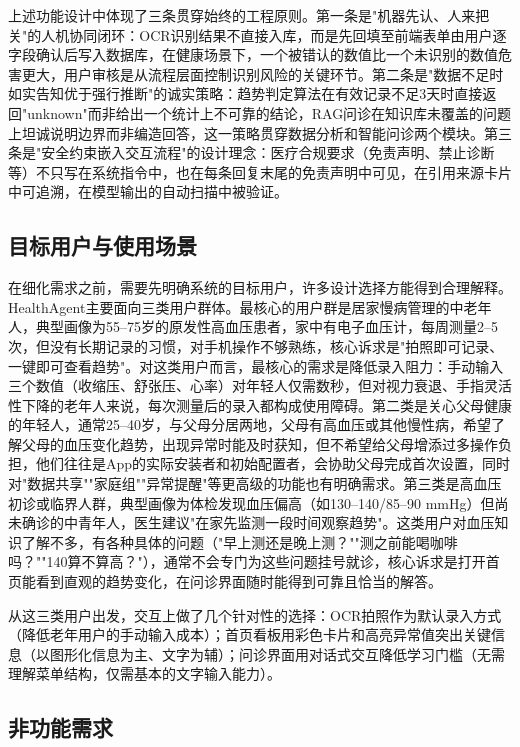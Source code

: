 \documentclass[zihao=-4,a4paper]{ctexart}
\numberwithin{figure}{section}
\numberwithin{table}{section}
\begin{document}
上述功能设计中体现了三条贯穿始终的工程原则。第一条是"机器先认、人来把关"的人机协同闭环：OCR识别结果不直接入库，而是先回填至前端表单由用户逐字段确认后写入数据库，在健康场景下，一个被错认的数值比一个未识别的数值危害更大，用户审核是从流程层面控制识别风险的关键环节。第二条是"数据不足时如实告知优于强行推断"的诚实策略：趋势判定算法在有效记录不足3天时直接返回"unknown"而非给出一个统计上不可靠的结论，RAG问诊在知识库未覆盖的问题上坦诚说明边界而非编造回答，这一策略贯穿数据分析和智能问诊两个模块。第三条是"安全约束嵌入交互流程"的设计理念：医疗合规要求（免责声明、禁止诊断等）不只写在系统指令中，也在每条回复末尾的免责声明中可见，在引用来源卡片中可追溯，在模型输出的自动扫描中被验证。

\subsection{目标用户与使用场景}

在细化需求之前，需要先明确系统的目标用户，许多设计选择方能得到合理解释。HealthAgent主要面向三类用户群体。最核心的用户群是居家慢病管理的中老年人，典型画像为55--75岁的原发性高血压患者，家中有电子血压计，每周测量2--5次，但没有长期记录的习惯，对手机操作不够熟练，核心诉求是"拍照即可记录、一键即可查看趋势"。对这类用户而言，最核心的需求是降低录入阻力：手动输入三个数值（收缩压、舒张压、心率）对年轻人仅需数秒，但对视力衰退、手指灵活性下降的老年人来说，每次测量后的录入都构成使用障碍。第二类是关心父母健康的年轻人，通常25--40岁，与父母分居两地，父母有高血压或其他慢性病，希望了解父母的血压变化趋势，出现异常时能及时获知，但不希望给父母增添过多操作负担，他们往往是App的实际安装者和初始配置者，会协助父母完成首次设置，同时对"数据共享""家庭组""异常提醒"等更高级的功能也有明确需求。第三类是高血压初诊或临界人群，典型画像为体检发现血压偏高（如130--140/85--90 mmHg）但尚未确诊的中青年人，医生建议"在家先监测一段时间观察趋势"。这类用户对血压知识了解不多，有各种具体的问题（"早上测还是晚上测？""测之前能喝咖啡吗？""140算不算高？"），通常不会专门为这些问题挂号就诊，核心诉求是打开首页能看到直观的趋势变化，在问诊界面随时能得到可靠且恰当的解答。

从这三类用户出发，交互上做了几个针对性的选择：OCR拍照作为默认录入方式（降低老年用户的手动输入成本）；首页看板用彩色卡片和高亮异常值突出关键信息（以图形化信息为主、文字为辅）；问诊界面用对话式交互降低学习门槛（无需理解菜单结构，仅需基本的文字输入能力）。

\subsection{非功能需求}
\end{document}
